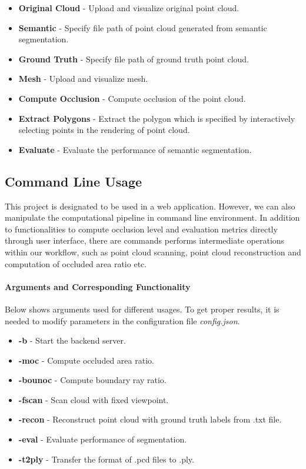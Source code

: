 \documentclass[11pt, a4paper,oneside,chapterprefix=false]{scrbook}
\begin{document}
\begin{itemize}
	\item \textbf{Original Cloud} - Upload and visualize original point cloud.
	\item \textbf{Semantic} - Specify file path of point cloud generated from semantic segmentation.
	\item \textbf{Ground Truth} - Specify file path of ground truth point cloud.
	\item \textbf{Mesh} - Upload and visualize mesh.
	\item \textbf{Compute Occlusion} - Compute occlusion of the point cloud.
	\item \textbf{Extract Polygons} - Extract the polygon which is specified by interactively selecting points in the rendering of point cloud.
	\item \textbf{Evaluate} - Evaluate the performance of semantic segmentation.
\end{itemize}


\subsection{Command Line Usage}

This project is designated to be used in a web application. However, we can also manipulate the computational pipeline in command line environment. In addition to functionalities to compute occlusion level and evaluation metrics directly through user interface, there are commands performs intermediate operations within our workflow, such as point cloud scanning, point cloud reconstruction and computation of occluded area ratio etc.  

\paragraph{Arguments and Corresponding Functionality}

Below shows arguments used for different usages. To get proper results, it is needed to modify parameters in the configuration file \emph{config.json}.

\begin{itemize}
        \item \textbf{-b} - Start the backend server.
	\item \textbf{-moc} - Compute occluded area ratio.
	\item \textbf{-bounoc} - Compute boundary ray ratio.
	\item \textbf{-fscan} - Scan cloud with fixed viewpoint.
	\item \textbf{-recon} - Reconstruct point cloud with ground truth labels from .txt file.
	\item \textbf{-eval} - Evaluate performance of segmentation.
        \item \textbf{-t2ply} - Transfer the format of .pcd files to .ply.
\end{itemize}
\end{document}
